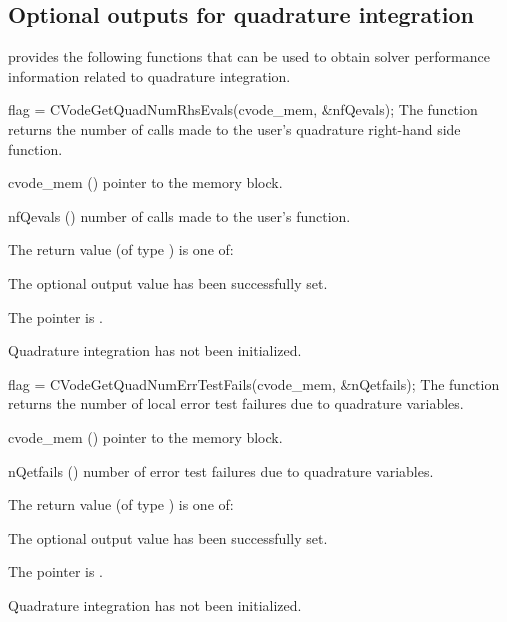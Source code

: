 
\subsection{Optional outputs for quadrature integration}\label{ss:quad_optional_output}

{\cvodes} provides the following functions that can be used to obtain solver
performance information related to quadrature integration.

{
  flag = CVodeGetQuadNumRhsEvals(cvode\_mem, \&nfQevals);
}
{
  The function  returns the 
  number of calls made to the user's quadrature right-hand side function.
}
{
  \begin{args}
  \item[cvode\_mem] ()
    pointer to the {\cvodes} memory block.
  \item[nfQevals] ()
    number of calls made to the user's  function.
  \end{args}
}
{
  The return value  (of type ) is one of:
  \begin{args}
  \item[\Id{CV\_SUCCESS}] 
    The optional output value has been successfully set.
  \item[\Id{CV\_MEM\_NULL}]
    The  pointer is .
  \item[\Id{CV\_NO\_QUAD}]
    Quadrature integration has not been initialized.
  \end{args}
}
{}
{
  flag = CVodeGetQuadNumErrTestFails(cvode\_mem, \&nQetfails);
}
{
  The function  returns the
  number of local error test failures due to quadrature variables.
}
{
  \begin{args}
  \item[cvode\_mem] ()
    pointer to the {\cvodes} memory block.
  \item[nQetfails] ()
    number of error test failures due to quadrature variables.
  \end{args}
}
{
  The return value  (of type ) is one of:
  \begin{args}
  \item[\Id{CV\_SUCCESS}] 
    The optional output value has been successfully set.
  \item[\Id{CV\_MEM\_NULL}]
    The  pointer is .
  \item[\Id{CV\_NO\_QUAD}]
    Quadrature integration has not been initialized.
  \end{args}
}
